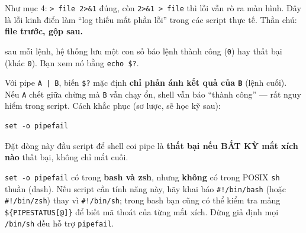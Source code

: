 \documentclass[12pt,a4paper]{article}
\newcommand{\cmd}[1]{\texttt{#1}}
\begin{document}
\begin{seniorbox}[title={Góc Senior \#2 --- Cạm bẫy thứ tự \texttt{2>\&1} (gặp hoài, kể cả người có kinh nghiệm)}]
Như mục 4: \cmd{> file 2>\&1} đúng, còn \cmd{2>\&1 > file} thì lỗi vẫn rò ra màn hình. Đây là lỗi kinh điển làm ``log thiếu mất phần lỗi'' trong các script thực tế. Thần chú: \textbf{file trước, gộp sau.}
\end{seniorbox}

\begin{seniorbox}[title={Góc Senior \#3 --- Mã thoát của pipe: \texttt{\$?} chỉ là của lệnh CUỐI}]
\begin{notebox}[title={Định nghĩa nhanh --- mã thoát (exit code) và \texttt{\$?}}]
sau mỗi lệnh, hệ thống lưu một con số báo lệnh thành công (\cmd{0}) hay thất bại (khác \cmd{0}). Bạn xem nó bằng \cmd{echo \$?}.
\end{notebox}

Với pipe \cmd{A | B}, biến \cmd{\$?} mặc định \textbf{chỉ phản ánh kết quả của \cmd{B}} (lệnh cuối). Nếu \cmd{A} chết giữa chừng mà \cmd{B} vẫn chạy ổn, shell vẫn báo ``thành công'' --- rất nguy hiểm trong script. Cách khắc phục (sơ lược, sẽ học kỹ sau):
\begin{Verbatim}
set -o pipefail
\end{Verbatim}
Đặt dòng này đầu script để shell coi pipe là \textbf{thất bại nếu BẤT KỲ mắt xích nào} thất bại, không chỉ mắt cuối.

\begin{notebox}[title={Lưu ý portable}]
\cmd{set -o pipefail} có trong \textbf{bash và zsh}, nhưng \textbf{không} có trong POSIX \cmd{sh} thuần (dash). Nếu script cần tính năng này, hãy khai báo \cmd{\#!/bin/bash} (hoặc \cmd{\#!/bin/zsh}) thay vì \cmd{\#!/bin/sh}; trong bash bạn cũng có thể kiểm tra mảng \cmd{\$\{PIPESTATUS[@]\}} để biết mã thoát của từng mắt xích. Đừng giả định mọi \cmd{/bin/sh} đều hỗ trợ \cmd{pipefail}.
\end{notebox}
\end{seniorbox}
\end{document}
